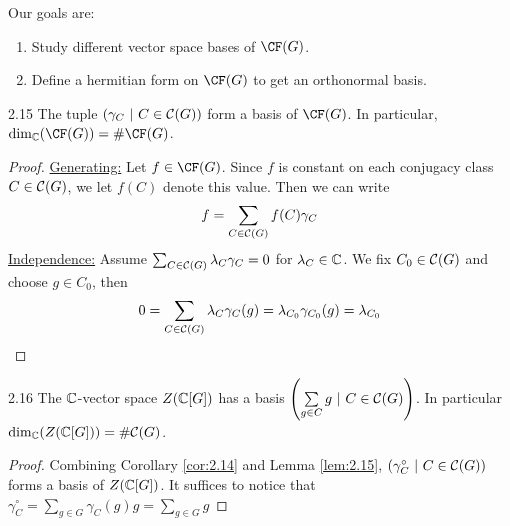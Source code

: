 \documentclass[twoside = false,	%
		headsepline,		%
		parskip = true,
		]{scrbook}						%
\begin{document}
    Our goals are:
    \begin{enumerate}
        \item Study different vector space bases of $\CF(G)$.
        \item Define a hermitian form on $\CF(G)$ to get an orthonormal basis.
    \end{enumerate}

    \begin{lemma}{}{2.15}
        The tuple $(\gamma_C \ | \ C \in \mathcal C(G))$ form a basis of $\CF(G)$. In particular, $\dim_\C(\CF(G)) = \# \CF(G)$.
    \end{lemma}
    \begin{proof}
        \underline{Generating:}
            Let $f \in \CF(G)$. Since $f$ is constant on each conjugacy class $C \in \mathcal C(G)$, we let $f(C)$ denote this value. Then we can write
            \begin{equation*}
                f = \sum_{C \in \mathcal C(G)} f(C) \gamma_C
            \end{equation*}
        \underline{Independence:}
            Assume $\sum_{C \in \mathcal C(G)} \lambda_C \gamma_C = 0$ for $\lambda_C \in \mathbb C$. We fix $C_0 \in \mathcal C(G)$ and choose $g \in C_0$, then
            \begin{equation*}
                0 = \sum_{C \in \mathcal C(G)} \lambda_C \gamma_C(g) = \lambda_{C_0} \gamma_{C_0}(g) = \lambda_{C_0}
            \end{equation*}
    \end{proof}
    \begin{corollary}{}{2.16}
        The $\mathbb C$-vector space $Z(\mathbb C[G])$ has a basis $\left( \sum\limits_{g \in C} g \ | \ C \in \mathcal C(G)\right)$. In particular $\dim_\mathbb C(Z(\mathbb C[G])) = \# \mathcal C(G)$.
    \end{corollary}
    \begin{proof}
        Combining Corollary \ref{cor:2.14} and Lemma \ref{lem:2.15}, $\left( \gamma_C^\circ \ | \ C \in \mathcal C(G)\right)$ forms a basis of $Z(\mathbb C[G])$. It suffices to notice that $\gamma_C^\circ = \sum\limits_{g \in G} \gamma_C(g)g = \sum\limits_{g \in G} g$
    \end{proof}
\end{document}
